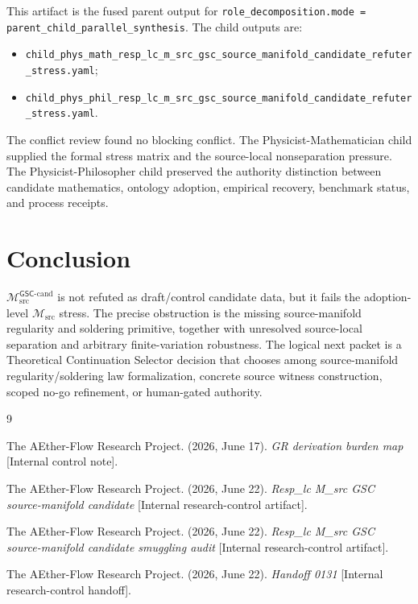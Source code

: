 \documentclass[11pt]{article}
\newcommand{\Msrc}{\mathcal{M}_{\mathrm{src}}}
\newcommand{\Mgsccand}{\mathcal{M}_{\mathrm{src}}^{\mathsf{GSC}\text{-}\mathrm{cand}}}
\begin{document}
This artifact is the fused parent output for
\texttt{role\_decomposition.mode = parent\_child\_parallel\_synthesis}. The
child outputs are:
\begin{itemize}
  \item \texttt{child\_phys\_math\_resp\_lc\_m\_src\_gsc\_source\_manifold\_candidate\_refuter\_stress.yaml};
  \item \texttt{child\_phys\_phil\_resp\_lc\_m\_src\_gsc\_source\_manifold\_candidate\_refuter\_stress.yaml}.
\end{itemize}
The conflict review found no blocking conflict. The
Physicist-Mathematician child supplied the formal stress matrix and the
source-local nonseparation pressure. The Physicist-Philosopher child
preserved the authority distinction between candidate mathematics, ontology
adoption, empirical recovery, benchmark status, and process receipts.

\section{Conclusion}

\(\Mgsccand\) is not refuted as draft/control candidate data, but it fails the
adoption-level \(\Msrc\) stress. The precise obstruction is the missing
source-manifold regularity and soldering primitive, together with unresolved
source-local separation and arbitrary finite-variation robustness. The logical
next packet is a Theoretical Continuation Selector decision that chooses
among source-manifold regularity/soldering law formalization, concrete source
witness construction, scoped no-go refinement, or human-gated authority.

\begin{thebibliography}{9}

The AEther-Flow Research Project. (2026, June 17). \emph{GR derivation
burden map} [Internal control note].

The AEther-Flow Research Project. (2026, June 22). \emph{Resp\_lc M\_src
GSC source-manifold candidate} [Internal research-control artifact].

The AEther-Flow Research Project. (2026, June 22). \emph{Resp\_lc M\_src
GSC source-manifold candidate smuggling audit}
[Internal research-control artifact].

The AEther-Flow Research Project. (2026, June 22). \emph{Handoff 0131}
[Internal research-control handoff].

\end{thebibliography}
\end{document}
